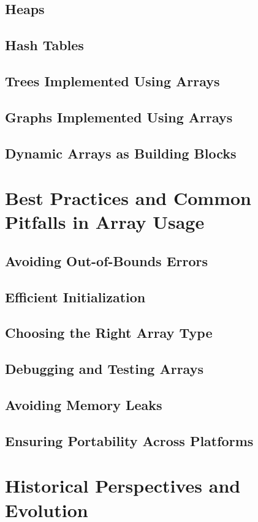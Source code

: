 \documentclass[12pt, oneside]{book}
\begin{document}
	\section{Heaps}
	\section{Hash Tables}
	\section{Trees Implemented Using Arrays}
	\section{Graphs Implemented Using Arrays}
	\section{Dynamic Arrays as Building Blocks}
	
	\chapter{Best Practices and Common Pitfalls in Array Usage}
	\section{Avoiding Out-of-Bounds Errors}
	\section{Efficient Initialization}
	\section{Choosing the Right Array Type}
	\section{Debugging and Testing Arrays}
	\section{Avoiding Memory Leaks}
	\section{Ensuring Portability Across Platforms}
	
	\chapter{Historical Perspectives and Evolution}
\end{document}
